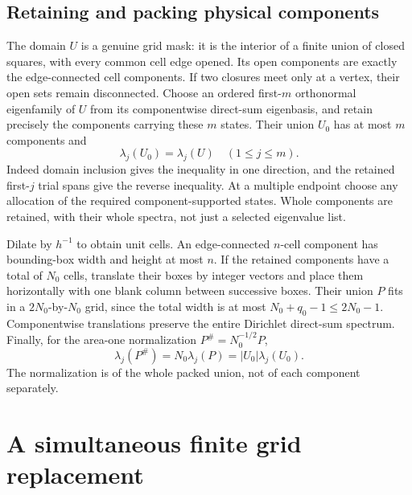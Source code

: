 \documentclass[11pt,reqno]{amsart}
\numberwithin{equation}{section}
\newcommand{\abs}[1]{\lvert#1\rvert}
\begin{document}
\subsection{Retaining and packing physical components}
\label{grid:component-retention}

The domain \(U\) is a genuine grid mask: it is the interior of a
finite union of closed squares, with every common cell edge opened.
Its open components are exactly the edge-connected cell components.
If two closures meet only at a vertex, their open sets remain
disconnected.  Choose an ordered first-\(m\) orthonormal eigenfamily
of \(U\) from its componentwise direct-sum eigenbasis, and retain
precisely the components carrying these \(m\) states.  Their union
\(U_0\) has at most \(m\) components and
\begin{equation}
 \lambda_j(U_0)=\lambda_j(U)\quad(1\le j\le m).
 \label{grid:retained-spectrum}
\end{equation}
Indeed domain inclusion gives the inequality in one direction, and
the retained first-\(j\) trial spans give the reverse inequality.
At a multiple endpoint choose any allocation of the required
component-supported states.  Whole components are retained, with
their whole spectra, not just a selected eigenvalue list.

Dilate by \(h^{-1}\) to obtain unit cells.  An edge-connected
\(n\)-cell component has bounding-box width and height at most \(n\).
If the retained components have a total of \(N_0\) cells, translate
their boxes by integer vectors and place them horizontally with one
blank column between successive boxes.  Their union \(P\) fits in
a \(2N_0\)-by-\(N_0\) grid, since the total width is at most
\(N_0+q_0-1\le2N_0-1\).  Componentwise translations preserve the
entire Dirichlet direct-sum spectrum.  Finally, for the
area-one normalization \(P^\#=N_0^{-1/2}P\),
\begin{equation}
 \lambda_j(P^\#)=N_0\lambda_j(P)
                =\abs{U_0}\lambda_j(U_0).
 \label{grid:normalization}
\end{equation}
The normalization is of the whole packed union, not of each
component separately.

\section{A simultaneous finite grid replacement}
\label{grid:prefix-section}
\end{document}
